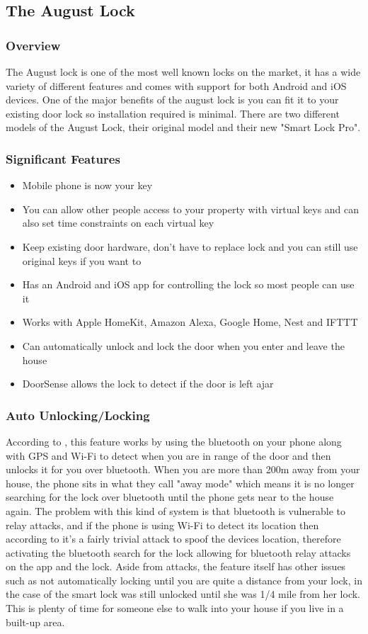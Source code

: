 \subsection{The August Lock}
\subsubsection{Overview}
The August lock is one of the most well known locks on the market, it has a wide variety of different features and comes with support for both Android and iOS devices. One of the major benefits of the august lock is you can fit it to your existing door lock so installation required is minimal. There are two different models of the August Lock, their original model and their new "Smart Lock Pro".

\subsubsection*{Significant Features}
\begin{itemize}
	\item Mobile phone is now your key
	\item You can allow other people access to your property with virtual keys and can also set time constraints on each virtual key
	\item Keep existing door hardware, don't have to replace lock and you can still use original keys if you want to
	\item Has an Android and iOS app for controlling the lock so most people can use it
	\item Works with Apple HomeKit, Amazon Alexa, Google Home, Nest and IFTTT
	\item Can automatically unlock and lock the door when you enter and leave the house
	\item DoorSense allows the lock to detect if the door is left ajar
\end{itemize}

\subsubsection*{Auto Unlocking/Locking}
According to \cite{August2017}, this feature works by using the bluetooth on your phone along with GPS and Wi-Fi to detect when you are in range of the door and then unlocks it for you over bluetooth. When you are more than 200m away from your house, the phone sits in what they call "away mode" which means it is no longer searching for the lock over bluetooth until the phone gets near to the house again. The problem with this kind of system is that bluetooth is vulnerable to relay attacks, and if the phone is using Wi-Fi to detect its location then according to \cite{Feng2014} it's a fairly trivial attack to spoof the devices location, therefore activating the bluetooth search for the lock allowing for bluetooth relay attacks on the app and the lock. Aside from attacks, the feature itself has other issues such as not automatically locking until you are quite a distance from your lock, in the case of \cite{So2017} the smart lock was still unlocked until she was 1/4 mile from her lock. This is plenty of time for someone else to walk into your house if you live in a built-up area.

